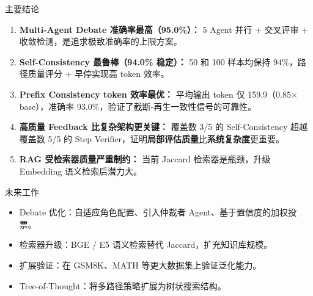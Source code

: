 \documentclass[10pt,aspectratio=169]{beamer}
\newcommand{\tightitems}{\setlength{\itemsep}{0.24em}}
\begin{document}
\begin{frame}{主要结论}
  \begin{enumerate}
    \tightitems
    \item \textbf{Multi-Agent Debate 准确率最高（95.0\%）：} 5 Agent 并行 + 交叉评审 + 收敛检测，是追求极致准确率的上限方案。
    \item \textbf{Self-Consistency 最鲁棒（94.0\% 稳定）：} 50 和 100 样本均保持 94\%，路径质量评分 + 早停实现高 token 效率。
    \item \textbf{Prefix Consistency token 效率最优：} 平均输出 token 仅 159.9（0.85× base），准确率 93.0\%，验证了截断-再生一致性信号的可靠性。
    \item \textbf{高质量 Feedback 比复杂架构更关键：} 覆盖数 3/5 的 Self-Consistency 超越覆盖数 5/5 的 Step Verifier，证明\textbf{局部评估质量}比\textbf{系统复杂度}更重要。
    \item \textbf{RAG 受检索器质量严重制约：} 当前 Jaccard 检索器是瓶颈，升级 Embedding 语义检索后潜力大。
  \end{enumerate}

  \vspace{0.5em}
  \begin{block}{未来工作}
    \small
    \begin{itemize}
      \tightitems
      \item Debate 优化：自适应角色配置、引入仲裁者 Agent、基于置信度的加权投票。
      \item 检索器升级：BGE / E5 语义检索替代 Jaccard，扩充知识库规模。
      \item 扩展验证：在 GSM8K、MATH 等更大数据集上验证泛化能力。
      \item Tree-of-Thought：将多路径策略扩展为树状搜索结构。
    \end{itemize}
  \end{block}
\end{frame}
\end{document}
